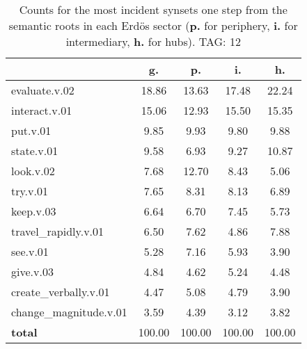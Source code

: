 \begin{table}[h!]
\begin{center}
\begin{tabular}{| l | c | c | c | c |}\hline
 & g. & p. & i. & h. \\\hline
evaluate.v.02 & 18.86  & 13.63  & 17.48  & 22.24 \\\hline
interact.v.01 & 15.06  & 12.93  & 15.50  & 15.35 \\\hline
put.v.01 & 9.85  & 9.93  & 9.80  & 9.88 \\\hline
state.v.01 & 9.58  & 6.93  & 9.27  & 10.87 \\\hline
look.v.02 & 7.68  & 12.70  & 8.43  & 5.06 \\\hline
try.v.01 & 7.65  & 8.31  & 8.13  & 6.89 \\\hline
keep.v.03 & 6.64  & 6.70  & 7.45  & 5.73 \\\hline
travel\_rapidly.v.01 & 6.50  & 7.62  & 4.86  & 7.88 \\\hline
see.v.01 & 5.28  & 7.16  & 5.93  & 3.90 \\\hline
give.v.03 & 4.84  & 4.62  & 5.24  & 4.48 \\\hline
create\_verbally.v.01 & 4.47  & 5.08  & 4.79  & 3.90 \\\hline
change\_magnitude.v.01 & 3.59  & 4.39  & 3.12  & 3.82 \\\hline
{{\bf total}} & 100.00  & 100.00  & 100.00  & 100.00 \\\hline
\end{tabular}
\caption{Counts for the most incident synsets one step from the semantic roots in each Erd\"os sector ({\bf p.} for periphery, {\bf i.} for intermediary, {\bf h.} for hubs). TAG: 12}
\end{center}
\end{table}